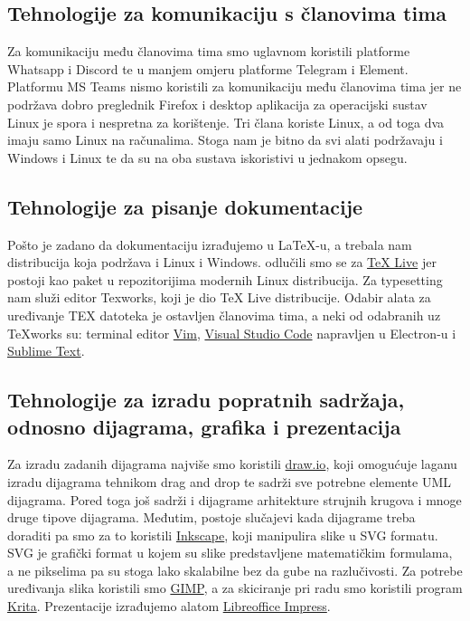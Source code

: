 			\subsection{Tehnologije za komunikaciju s članovima tima}
				Za komunikaciju među članovima tima smo uglavnom koristili platforme Whatsapp i Discord te u manjem omjeru platforme Telegram i Element. Platformu MS Teams nismo koristili za komunikaciju među članovima tima jer ne podržava dobro preglednik Firefox i desktop aplikacija za operacijski sustav Linux je spora i nespretna za korištenje. Tri člana koriste Linux, a od toga dva imaju samo Linux na računalima. Stoga nam je bitno da svi alati podržavaju i Windows i Linux te da su na oba sustava iskoristivi u jednakom opsegu.
				
			\subsection{Tehnologije za pisanje dokumentacije}
				Pošto je zadano da dokumentaciju izrađujemo u LaTeX-u, a trebala nam distribucija koja podržava i Linux i Windows. odlučili smo se za \href{https://www.tug.org/texlive/}{TeX Live} jer postoji kao paket u repozitorijima modernih Linux distribucija. Za typesetting nam služi editor Texworks, koji je dio TeX Live distribucije. Odabir alata za uređivanje TEX datoteka je ostavljen članovima tima, a neki od odabranih uz TeXworks su: terminal editor \href{https://www.vim.org/}{Vim}, \href{https://code.visualstudio.com/}{Visual Studio Code} napravljen u Electron-u i \href{https://www.sublimetext.com/}{Sublime Text}.
			
			\subsection{Tehnologije za izradu popratnih sadržaja, odnosno dijagrama, grafika i prezentacija}
				Za izradu zadanih dijagrama najviše smo koristili \href{https://www.drawio.com/}{draw.io}, koji omogućuje laganu izradu dijagrama tehnikom drag and drop te sadrži sve potrebne elemente UML dijagrama. Pored toga još sadrži i dijagrame arhitekture strujnih krugova i mnoge druge tipove dijagrama. Međutim, postoje slučajevi kada dijagrame treba doraditi pa smo za to koristili \href{https://inkscape.org/}{Inkscape}, koji manipulira slike u SVG formatu. SVG je grafički format u kojem su slike predstavljene matematičkim formulama, a ne pikselima pa su stoga lako skalabilne bez da gube na razlučivosti. Za potrebe uređivanja slika koristili smo \href{https://www.gimp.org/}{GIMP}, a za skiciranje pri radu smo koristili program \href{https://krita.org/}{Krita}. Prezentacije izrađujemo alatom \href{https://www.libreoffice.org/}{Libreoffice Impress}.
				
